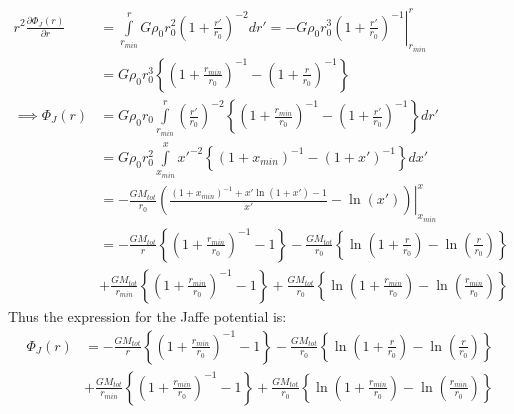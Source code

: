 \documentclass[]{article}
\begin{document}
\begin{align*}
	r^2\frac{\partial\Phi_{J}(r)}{\partial r} &= \int\limits_{r_{min}}^{r}G\rho_0r_0^{2}\left(1+\frac{r'}{r_0}\right)^{-2}dr' = -G\rho_0r_0^{3}\left.\left(1+\frac{r'}{r_0}\right)^{-1}\right|_{r_{min}}^{r}\\
	&= G\rho_0r_0^{3}\left\{\left(1+\frac{r_{min}}{r_0}\right)^{-1} - \left(1+\frac{r}{r_0}\right)^{-1}\right\}\\
	\implies \Phi_J(r) &= G\rho_0r_0\int\limits_{r_{min}}^{r}\left(\frac{r'}{r_0}\right)^{-2}\left\{\left(1+\frac{r_{min}}{r_0}\right)^{-1} - \left(1+\frac{r'}{r_0}\right)^{-1}\right\}dr'\\
	&= G\rho_0r_0^2\int\limits_{x_{min}}^{x}x'^{-2}\left\{\left(1+x_{min}\right)^{-1} - \left(1+x'\right)^{-1}\right\}dx'\\
	&= -\frac{GM_{tot}}{r_0}\left.\left(\frac{\left(1+x_{min}\right)^{-1}+x'\ln(1+x')-1}{x'}-\ln(x')\right)\right|_{x_{min}}^{x}\\
	&= -\frac{GM_{tot}}{r}\left\{\left(1+\frac{r_{min}}{r_0}\right)^{-1} - 1\right\}-\frac{GM_{tot}}{r_0}\left\{\ln\left(1+\frac{r}{r_0}\right)-\ln\left(\frac{r}{r_0}\right)\right\}\\
	& + \frac{GM_{tot}}{r_{min}}\left\{\left(1+\frac{r_{min}}{r_0}\right)^{-1} - 1\right\} + \frac{GM_{tot}}{r_0}\left\{\ln\left(1+\frac{r_{min}}{r_0}\right)-\ln\left(\frac{r_{min}}{r_0}\right)\right\}
\end{align*}
Thus the expression for the Jaffe potential is:
\begin{align}
	\Phi_J(r) &= -\frac{GM_{tot}}{r}\left\{\left(1+\frac{r_{min}}{r_0}\right)^{-1} - 1\right\}-\frac{GM_{tot}}{r_0}\left\{\ln\left(1+\frac{r}{r_0}\right)-\ln\left(\frac{r}{r_0}\right)\right\}\nonumber\\
	& + \frac{GM_{tot}}{r_{min}}\left\{\left(1+\frac{r_{min}}{r_0}\right)^{-1} - 1\right\} + \frac{GM_{tot}}{r_0}\left\{\ln\left(1+\frac{r_{min}}{r_0}\right)-\ln\left(\frac{r_{min}}{r_0}\right)\right\}
\end{align}
\end{document}
